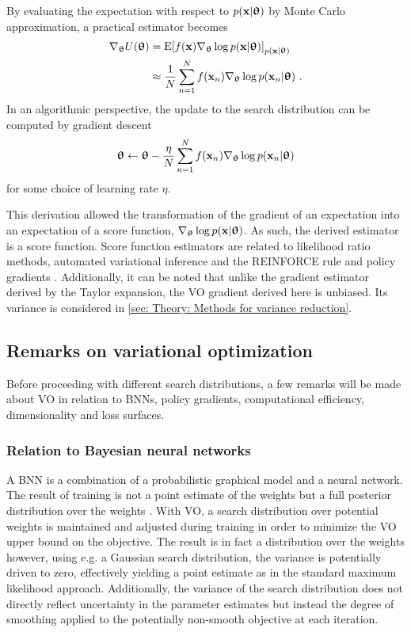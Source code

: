 By evaluating the expectation with respect to $p({\mathbf{x}}|{{\boldsymbol{\uptheta}}})$ by Monte Carlo approximation, a practical estimator becomes
\begin{align}
    \nabla_{{\boldsymbol{\uptheta}}} U({{\boldsymbol{\uptheta}}})
    &= \text{E}{\left[f({\mathbf{x}})\nabla_{{\boldsymbol{\uptheta}}} \log p({\mathbf{x}}|{{\boldsymbol{\uptheta}}})\right]}_{p({\mathbf{x}}|{{\boldsymbol{\uptheta}}})}\nonumber\\
    &\approx \frac{1}{N}\sum_{n=1}^N f({\mathbf{x}}_n)\nabla_{{\boldsymbol{\uptheta}}} \log p({\mathbf{x}}_n|{{\boldsymbol{\uptheta}}}) \ .\label{eq: Theory: Variational optimization gradient estimator sampling general search distribution}
\end{align}
In an algorithmic perspective, the update to the search distribution can be computed by gradient descent
\begin{equation}
    {{\boldsymbol{\uptheta}}} \leftarrow {{\boldsymbol{\uptheta}}} - \frac{\eta}{N}\sum_{n=1}^N f({\mathbf{x}}_n)\nabla_{{\boldsymbol{\uptheta}}} \log p({\mathbf{x}}_n|{{\boldsymbol{\uptheta}}})
\end{equation}
for some choice of learning rate $\eta$.

This derivation allowed the transformation of the gradient of an expectation into an expectation of a score function, $\nabla_{{\boldsymbol{\uptheta}}}\log p({\mathbf{x}}|{{\boldsymbol{\uptheta}}})$. As such, the derived estimator is a score function. Score function estimators are related to likelihood ratio methods, automated variational inference \cite{Wingate2013} and the REINFORCE rule and policy gradients \cite{Williams1992}. Additionally, it can be noted that unlike the gradient estimator derived by the Taylor expansion, the \gls{VO} gradient derived here is unbiased. Its variance is considered in \autoref{sec: Theory: Methods for variance reduction}.


\subsection{Remarks on variational optimization}\label{sec: Variational optimization: Remarks main section}
Before proceeding with different search distributions, a few remarks will be made about \gls{VO} in relation to \glspl{BNN}, policy gradients, computational efficiency, dimensionality and loss surfaces.

\subsubsection{Relation to Bayesian neural networks}
A \gls{BNN} is a combination of a probabilistic graphical model and a neural network. The result of training is not a point estimate of the weights but a full posterior distribution over the weights \cite{Goodfellow2016}. With \gls{VO}, a search distribution over potential weights is maintained and adjusted during training in order to minimize the \gls{VO} upper bound on the objective. The result is in fact a distribution over the weights however, using e.g. a Gaussian search distribution, the variance is potentially driven to zero, effectively yielding a point estimate as in the standard maximum likelihood approach. Additionally, the variance of the search distribution does not directly reflect uncertainty in the parameter estimates but instead the degree of smoothing applied to the potentially non-smooth objective at each iteration.

